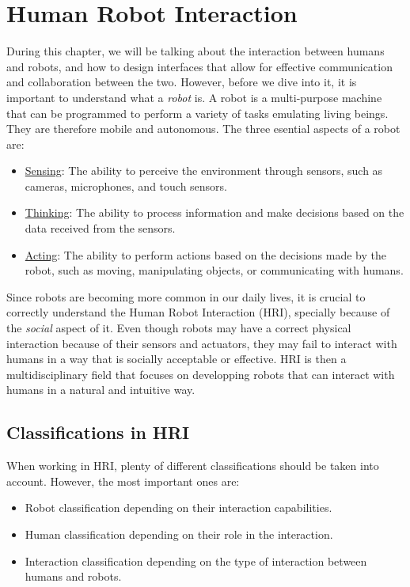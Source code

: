 \chapter{Human Robot Interaction}

During this chapter, we will be talking about the interaction between humans and robots, and how to design interfaces that allow for effective communication and collaboration between the two. However, before we dive into it, it is important to understand what a \emph{robot} is. A robot is a multi-purpose machine that can be programmed to perform a variety of tasks emulating living beings. They are therefore mobile and autonomous. The three esential aspects of a robot are:
\begin{itemize}
    \item \ul{Sensing}: The ability to perceive the environment through sensors, such as cameras, microphones, and touch sensors.
    \item \ul{Thinking}: The ability to process information and make decisions based on the data received from the sensors.
    \item \ul{Acting}: The ability to perform actions based on the decisions made by the robot, such as moving, manipulating objects, or communicating with humans.
\end{itemize}

Since robots are becoming more common in our daily lives, it is crucial to correctly understand the Human Robot Interaction (HRI), specially because of the \emph{social} aspect of it. Even though robots may have a correct physical interaction because of their sensors and actuators, they may fail to interact with humans in a way that is socially acceptable or effective. HRI is then a multidisciplinary field that focuses on developping robots that can interact with humans in a natural and intuitive way.

\section{Classifications in HRI}

When working in HRI, plenty of different  classifications should be taken into account. However, the most important ones are:
\begin{itemize}
    \item Robot classification depending on their interaction capabilities.
    \item Human classification depending on their role in the interaction.
    \item Interaction classification depending on the type of interaction between humans and robots.
\end{itemize}

